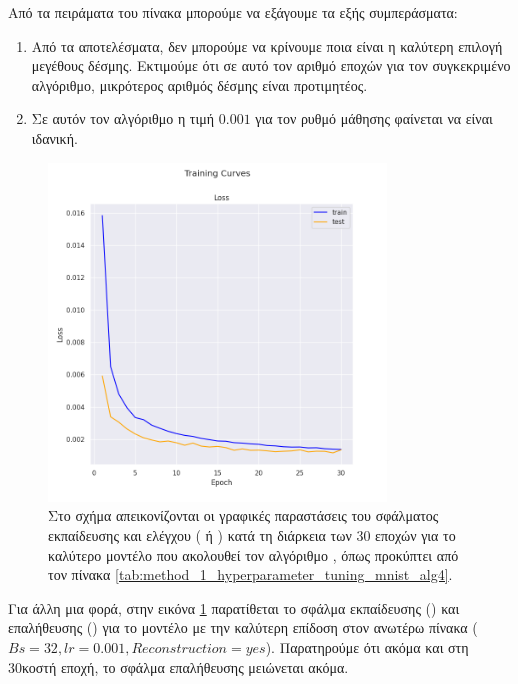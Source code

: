 Από τα πειράματα του πίνακα μπορούμε να εξάγουμε τα εξής συμπεράσματα:
\begin{enumerate}
    \item Από τα αποτελέσματα, δεν μπορούμε να κρίνουμε ποια είναι η καλύτερη επιλογή μεγέθους δέσμης. Εκτιμούμε ότι σε αυτό τον αριθμό εποχών για τον συγκεκριμένο αλγόριθμο, μικρότερος αριθμός δέσμης είναι προτιμητέος.
    \item Σε αυτόν τον αλγόριθμο η τιμή $0.001$ για τον ρυθμό μάθησης φαίνεται να είναι ιδανική.
\end{enumerate}
\begin{figure}[h]
    \centering
    \includegraphics[width=0.8\textwidth]{images/chapter experiments/method 1/image 3/train_curve.png}
    \caption{Στο σχήμα απεικονίζονται οι γραφικές παραστάσεις του σφάλματος εκπαίδευσης και ελέγχου ( ή ) κατά τη διάρκεια των 30 εποχών για το καλύτερο μοντέλο που ακολουθεί τον αλγόριθμο , όπως προκύπτει από τον πίνακα \ref{tab:method_1_hyperparameter_tuning_mnist_alg4}.}
    \label{fig:exp_method_1_mnist_alg4}
  \end{figure}
Για άλλη μια φορά, στην εικόνα \ref{fig:exp_method_1_mnist_alg4} παρατίθεται το σφάλμα εκπαίδευσης () και επαλήθευσης () για το μοντέλο με την καλύτερη επίδοση στον ανωτέρω πίνακα ($Bs = 32, lr = 0.001, Reconstruction = yes$). Παρατηρούμε ότι ακόμα και στη 30κοστή εποχή, το σφάλμα επαλήθευσης μειώνεται ακόμα.\par

